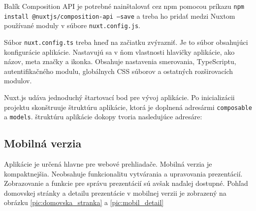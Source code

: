 \vspace{5mm}
Balík Composition API je potrebné nainštalovať cez npm pomocou príkazu \texttt{npm install @nuxtjs/composition-api --save} a treba ho pridať medzi Nuxtom používané moduly v súbore \texttt{nuxt.config.js}.

Súbor \texttt{nuxt.config.ts} treba hneď na začiatku zvýrazniť. Je to súbor obsahujúci konfigurácie aplikácie. Nastavujú sa v ňom vlastnosti hlavičky aplikácie, ako názov, meta značky a ikonka. Obsahuje nastavenia smerovania, TypeScriptu, autentifikačného modulu, globálnych CSS súborov a ostatných rozširovacích modulov.

Nuxt.js udáva jednoduchý štartovací bod pre vývoj aplikácie. Po inicializácii projektu skonštruuje štruktúru aplikácie, ktorá je doplnená adresármi \texttt{composable} a \texttt{models}. štruktúru aplikácie dokopy tvoria nasledujúce adresáre:

\vspace{5mm}
\vspace{5mm}

\subsection*{Mobilná verzia}
Aplikácie je určená hlavne pre webové prehliadače. Mobilná verzia je kompaktnejšia. Neobsahuje funkcionalitu vytvárania a upravovania prezentácií. Zobrazovanie a funkcie pre správu prezentácií sú avšak naďalej dostupné. Pohľad domovskej stránky a detailu prezentácie v mobilnej verzii je zobrazený na obrázku \ref{pic:domovska_stranka} a \ref{pic:mobil_detail}

